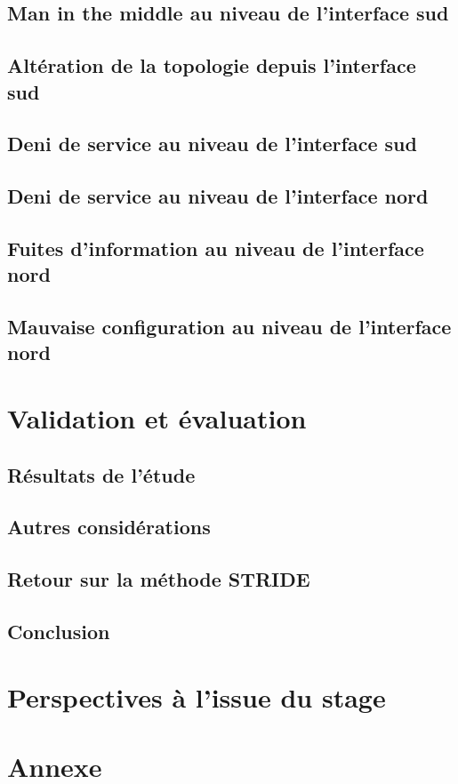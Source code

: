\documentclass[11pt]{article}
\begin{document}
	\subsection{Man in the middle au niveau de l'interface sud}
		
		\newpage
	\subsection{Altération de la topologie depuis l'interface sud}
		
		\newpage
	\subsection{Deni de service au niveau de l'interface sud}
		
		\newpage
	\subsection{Deni de service au niveau de l'interface nord}
		
		\newpage
	\subsection{Fuites d'information au niveau de l'interface nord}
		
		\newpage
	\subsection{Mauvaise configuration au niveau de l'interface nord}
		
\newpage
{}
\section{Validation et évaluation}
	\subsection{Résultats de l'étude}
		
	\subsection{Autres considérations}
		
	\subsection{Retour sur la méthode STRIDE}
		
	\newpage
	\subsection{Conclusion}
		
\newpage
{}
\section{Perspectives à l'issue du stage}
	

\newpage


\nocite{*}

\newpage
\appendix
\section{Annexe}
	
\end{document}

